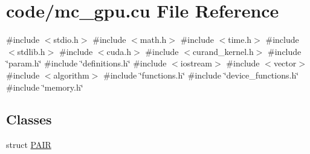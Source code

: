 \hypertarget{mc__gpu_8cu}{}\section{code/mc\+\_\+gpu.cu File Reference}
\label{mc__gpu_8cu}
{\ttfamily \#include $<$stdio.\+h$>$}\newline
{\ttfamily \#include $<$math.\+h$>$}\newline
{\ttfamily \#include $<$time.\+h$>$}\newline
{\ttfamily \#include $<$stdlib.\+h$>$}\newline
{\ttfamily \#include $<$cuda.\+h$>$}\newline
{\ttfamily \#include $<$curand\+\_\+kernel.\+h$>$}\newline
{\ttfamily \#include \char`\"{}param.\+h\char`\"{}}\newline
{\ttfamily \#include \char`\"{}definitions.\+h\char`\"{}}\newline
{\ttfamily \#include $<$iostream$>$}\newline
{\ttfamily \#include $<$vector$>$}\newline
{\ttfamily \#include $<$algorithm$>$}\newline
{\ttfamily \#include \char`\"{}functions.\+h\char`\"{}}\newline
{\ttfamily \#include \char`\"{}device\+\_\+functions.\+h\char`\"{}}\newline
{\ttfamily \#include \char`\"{}memory.\+h\char`\"{}}\newline
\subsection*{Classes}
\begin{DoxyCompactItemize}
\item 
struct \hyperlink{structPAIR}{P\+A\+IR}
\end{DoxyCompactItemize}
